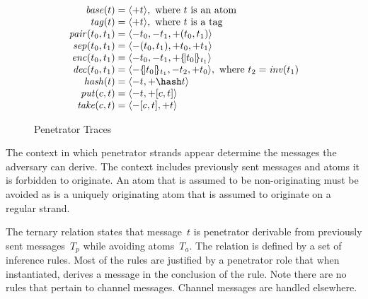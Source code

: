 \documentclass[12pt]{report}
\theoremstyle{definition}
\begin{document}
\begin{figure}
\[\begin{array}{r@{{}={}}l}
\fn{base}(t)&\seq{\outbnd t},\mbox{ where $t$ is an atom}\\
\fn{tag}(t)&\seq{\outbnd t},\mbox{ where $t$ is a tag}\\
\fn{pair}(t_0,t_1)&\seq{\inbnd t_0,\inbnd t_1, \outbnd(t_0,
  t_1)}\\
\fn{sep}(t_0,t_1)&\seq{\inbnd(t_0, t_1),\outbnd
    t_0,\outbnd t_1}\\
\fn{enc}(t_0,t_1)&\seq{\inbnd t_0,\inbnd t_1,
\outbnd\enc{t_0}{t_1}}\\
\fn{dec}(t_0,t_1)&\seq{\inbnd\enc{t_0}{t_1},
\inbnd t_2,\outbnd t_0},\mbox{ where $t_2=\fn{inv}(t_1)$}\\
\fn{hash}(t)&\seq{\inbnd t,\outbnd\hash t}\\
\fn{put}(c,t)&\seq{\inbnd t, \outbnd[c,t]}\\
\fn{take}(c,t)&\seq{\inbnd[c,t], \outbnd t}
\end{array}\]
\caption{Penetrator Traces}\label{fig:pen traces}
\end{figure}

The context in which penetrator strands appear determine the messages
the adversary can derive.  The context includes previously sent
messages and atoms it is forbidden to originate.  An atom that is
assumed to be non-originating must be avoided as is a uniquely
originating atom that is assumed to originate on a regular strand.

The ternary relation  states that message~$t$ is
penetrator derivable from previously sent messages~$T_p$ while
avoiding atoms~$T_a$.  The relation is defined by a set of inference
rules.  Most of the rules are justified by a penetrator role that when
instantiated, derives a message in the conclusion of the rule.  Note
there are no rules that pertain to channel messages.  Channel messages
are handled elsewhere.
\end{document}
